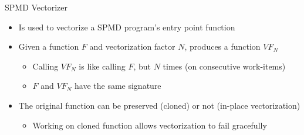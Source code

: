 
\begin{frame}{SPMD Vectorizer}

\begin{minipage}[t]{0.45\linewidth}

\begin{itemize}
    \item Is used to vectorize a SPMD program's entry point function
    \item Given a function $F$ and vectorization factor $N$, produces a function $VF_N$
    \begin{itemize}
        \item Calling $VF_N$ is like calling $F$, but $N$ times (on consecutive work-items)
        \item $F$ and $VF_N$ have the same signature
    \end{itemize}
    
    \item The original function can be preserved (cloned) or not (in-place vectorization)
    \begin{itemize}
        \item Working on cloned function allows vectorization to fail gracefully
    \end{itemize}
    
\end{itemize}

\end{minipage}
\hspace{1em}
\begin{minipage}[t]{0.48\linewidth}

\vspace{0.1ex}

\end{minipage}

\end{frame}

